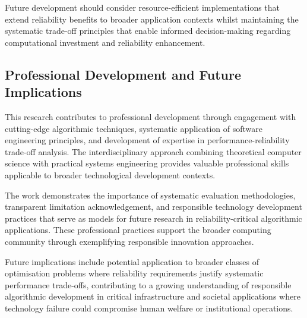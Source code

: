 Future development should consider resource-efficient implementations that extend reliability benefits to broader application contexts whilst maintaining the systematic trade-off principles that enable informed decision-making regarding computational investment and reliability enhancement.

\subsection{Professional Development and Future Implications}

This research contributes to professional development through engagement with cutting-edge algorithmic techniques, systematic application of software engineering principles, and development of expertise in performance-reliability trade-off analysis. The interdisciplinary approach combining theoretical computer science with practical systems engineering provides valuable professional skills applicable to broader technological development contexts.

The work demonstrates the importance of systematic evaluation methodologies, transparent limitation acknowledgement, and responsible technology development practices that serve as models for future research in reliability-critical algorithmic applications. These professional practices support the broader computing community through exemplifying responsible innovation approaches.

Future implications include potential application to broader classes of optimisation problems where reliability requirements justify systematic performance trade-offs, contributing to a growing understanding of responsible algorithmic development in critical infrastructure and societal applications where technology failure could compromise human welfare or institutional operations.